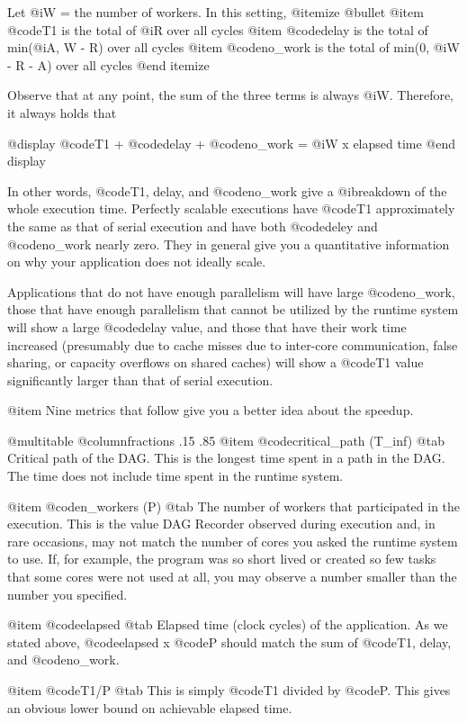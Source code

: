 Let @i{W =} the number of workers.  In this setting,
@itemize @bullet
@item @code{T1} is the total of @i{R} over all cycles
@item @code{delay} is the total of min(@i{A, W - R}) over all cycles
@item @code{no_work} is the total of min(0, @i{W - R - A}) over all cycles
@end itemize

Observe that at any point, the sum of the three terms is always @i{W}.
Therefore, it always holds that 

@display
@code{T1} + @code{delay} + @code{no_work} = @i{W} x elapsed time
@end display

In other words, @code{T1, delay}, and @code{no_work} give a
@i{breakdown} of the whole execution time.  Perfectly scalable
executions have @code{T1} approximately the same as that of serial
execution and have both @code{deley} and @code{no_work} nearly zero.
They in general give you a quantitative information on why your
application does not ideally scale.

Applications that do not have enough parallelism will have large
@code{no_work}, those that have enough parallelism that cannot
be utilized by the runtime system will show a large @code{delay} value,
and those that have their work time increased (presumably due to
cache misses due to inter-core communication, false sharing, or 
capacity overflows on shared caches) will show a @code{T1} value
significantly larger than that of serial execution.

@item Nine metrics that follow give you a better idea about the
speedup.

@multitable @columnfractions .15 .85
@item @code{critical_path (T_inf)} @tab Critical path of the DAG.  This
is the longest time spent in a path in the DAG.  The time does not
include time spent in the runtime system.

@item @code{n_workers (P)} @tab
The number of workers that participated in the execution.  This is
the value DAG Recorder observed during execution and, in rare occasions,
may not match the number of cores you asked the runtime system to use.
If, for example, the program was so short lived or created so few tasks
that some cores were not used at all, you may observe a number smaller than
the number you specified.

@item @code{elapsed} @tab
Elapsed time (clock cycles) of the application.
As we stated above, @code{elapsed} x @code{P} should match the sum
of @code{T1, delay,} and @code{no_work}.

@item @code{T1/P} @tab 
This is simply @code{T1} divided by @code{P}. 
This gives an obvious lower bound on achievable elapsed time.

